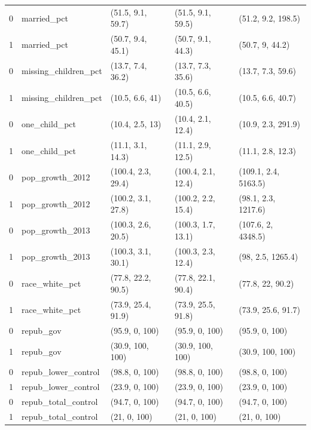 \documentclass{article}
\begin{document}
\begin{appendix}
\begin{table}[ht]
\begin{tabular}{rllll}
  0 & married\_pct & (51.5, 9.1, 59.7) & (51.5, 9.1, 59.5) & (51.2, 9.2, 198.5) \\ 
  1 & married\_pct & (50.7, 9.4, 45.1) & (50.7, 9.1, 44.3) & (50.7, 9, 44.2) \\ 
  0 & missing\_children\_pct & (13.7, 7.4, 36.2) & (13.7, 7.3, 35.6) & (13.7, 7.3, 59.6) \\ 
  1 & missing\_children\_pct & (10.5, 6.6, 41) & (10.5, 6.6, 40.5) & (10.5, 6.6, 40.7) \\ 
  0 & one\_child\_pct & (10.4, 2.5, 13) & (10.4, 2.1, 12.4) & (10.9, 2.3, 291.9) \\ 
  1 & one\_child\_pct & (11.1, 3.1, 14.3) & (11.1, 2.9, 12.5) & (11.1, 2.8, 12.3) \\ 
  0 & pop\_growth\_2012 & (100.4, 2.3, 29.4) & (100.4, 2.1, 12.4) & (109.1, 2.4, 5163.5) \\ 
  1 & pop\_growth\_2012 & (100.2, 3.1, 27.8) & (100.2, 2.2, 15.4) & (98.1, 2.3, 1217.6) \\ 
  0 & pop\_growth\_2013 & (100.3, 2.6, 20.5) & (100.3, 1.7, 13.1) & (107.6, 2, 4348.5) \\ 
  1 & pop\_growth\_2013 & (100.3, 3.1, 30.1) & (100.3, 2.3, 12.4) & (98, 2.5, 1265.4) \\ 
  0 & race\_white\_pct & (77.8, 22.2, 90.5) & (77.8, 22.1, 90.4) & (77.8, 22, 90.2) \\ 
  1 & race\_white\_pct & (73.9, 25.4, 91.9) & (73.9, 25.5, 91.8) & (73.9, 25.6, 91.7) \\ 
  0 & repub\_gov & (95.9, 0, 100) & (95.9, 0, 100) & (95.9, 0, 100) \\ 
  1 & repub\_gov & (30.9, 100, 100) & (30.9, 100, 100) & (30.9, 100, 100) \\ 
  0 & repub\_lower\_control & (98.8, 0, 100) & (98.8, 0, 100) & (98.8, 0, 100) \\ 
  1 & repub\_lower\_control & (23.9, 0, 100) & (23.9, 0, 100) & (23.9, 0, 100) \\ 
  0 & repub\_total\_control & (94.7, 0, 100) & (94.7, 0, 100) & (94.7, 0, 100) \\ 
  1 & repub\_total\_control & (21, 0, 100) & (21, 0, 100) & (21, 0, 100) \\
   \hline
\end{tabular}
\end{table}


\end{appendix}
\end{document}
